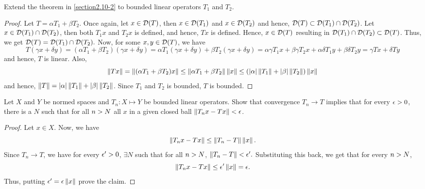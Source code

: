 \begin{question}
    Extend the theorem in \ref{section2.10-2} to bounded linear operators $T_1$ and $T_2$.
    \label{section2.10-3}
\end{question}
\begin{proof}
    Let $T = \alpha T_1 + \beta T_2$. Once again, let $x \in \mathcal{D}(T)$, then $x \in \mathcal{D}(T_1)$ and $x \in \mathcal{D}(T_2)$ and hence, $\mathcal{D}(T) \subset \mathcal{D}(T_1) \cap \mathcal{D}(T_2)$. Let $x \in \mathcal{D}(T_1) \cap \mathcal{D}(T_2)$, then both $T_1 x$ and $T_2 x$ is defined, and hence, $Tx$ is defined. Hence, $x \in \mathcal{D}(T)$ resulting in $\mathcal{D}(T_1) \cap \mathcal{D}(T_2) \subset \mathcal{D}(T)$. Thus, we get $\mathcal{D}(T) = \mathcal{D}(T_1) \cap \mathcal{D}(T_2).$ Now, for some $x , y \in \mathcal{D}(T)$, we have
    \[T(\gamma x + \delta y) = (\alpha T_1 + \beta T_2)(\gamma x + \delta y) = \alpha T_1(\gamma x + \delta y) + \beta T_2(\gamma x + \delta y) = \alpha \gamma T_1 x + \beta \gamma T_2 x + \alpha \delta T_1 y + \beta \delta T_2 y = \gamma Tx + \delta T y\]
    and hence, $T$ is linear. Also,
    \[\left\lVert Tx \right\rVert = \left\lVert (\alpha T_1 + \beta T_2)x \right\rVert \leq \left\lVert \alpha T_1 + \beta T_2 \right\rVert \left\lVert x \right\rVert \leq (\left\lvert \alpha \right\rvert \left\lVert T_1 \right\rVert + \left\lvert \beta \right\rvert \left\lVert T_2 \right\rVert)\left\lVert x \right\rVert\]
    and hence, $\left\lVert T \right\rVert = \left\lvert \alpha \right\rvert \left\lVert T_1 \right\rVert + \left\lvert \beta \right\rvert \left\lVert T_2 \right\rVert$. Since $T_1$ and $T_2$ is bounded, $T$ is bounded.
\end{proof}

\begin{question}
    Let $X$ and $Y$ be normed spaces and $T_n : X \mapsto Y$ be bounded linear operators. Show that convergence $T_n \rightarrow T$ implies that for every $\epsilon > 0$, there is a $N$ such that for all $n >  N$ all $x$ in a given closed ball $\left\lVert T_n x - T x \right\rVert < \epsilon$.
    \label{section2.10-4}
\end{question}
\begin{proof}
    Let $x \in X$. Now, we have
    \[\left\lVert T_n x - T x \right\rVert \leq \left\lVert T_n - T \right\rVert \left\lVert x \right\rVert.\]
    Since $T_n \rightarrow T$, we have for every $\epsilon^\prime > 0$, $\exists N$ such that for all $n > N$, $\left\lVert T_n - T \right\rVert < \epsilon^\prime.$ Substituting this back, we get that for every $n > N$,
    \[\left\lVert T_n x - T x \right\rVert \leq \epsilon^\prime \left\lVert x \right\rVert = \epsilon.\]
    Thus, putting $\epsilon^\prime = \epsilon \left\lVert x \right\rVert$ prove the claim.
\end{proof}



